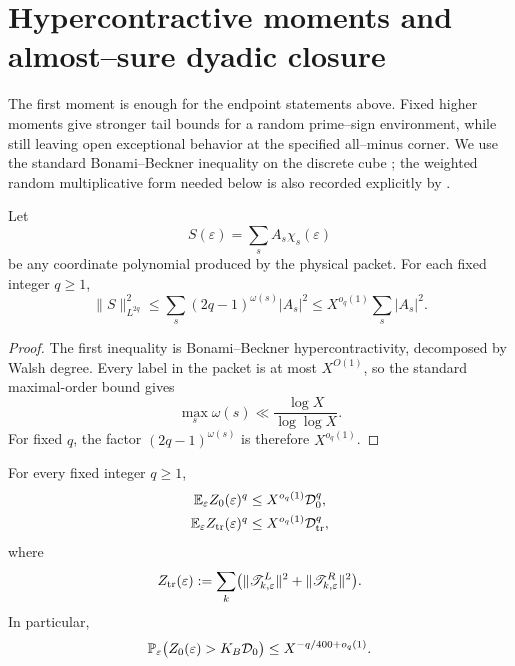 \section{Hypercontractive moments and almost--sure dyadic closure}
\label{sec:tpc43-moments}

The first moment is enough for the endpoint statements above.  Fixed
higher moments give stronger tail bounds for a random prime--sign
environment, while still leaving open exceptional behavior at the
specified all--minus corner.  We use the standard Bonami--Beckner inequality on the
discrete cube \citep{Bonami1970,Beckner1975}; the weighted random
multiplicative form needed below is also recorded explicitly by
\citet[Probability Result~2.3]{Harper2019HighMoments}.

\begin{lemma}
\label{lem:tpc43-one-coordinate-moment}
Let
\begin{equation}
 S(\varepsilon)=\sum_s A_s\chi_s(\varepsilon)
 \label{eq:tpc43-one-coordinate-polynomial}
\end{equation}
be any coordinate polynomial produced by the physical packet.  For each
fixed integer \(q\ge1\),
\begin{equation}
 \|S\|_{L^{2q}}^2
 \le
 \sum_s(2q-1)^{\omega(s)}|A_s|^2
 \le X^{o_q(1)}\sum_s|A_s|^2.
 \label{eq:tpc43-hypercontractive-coordinate}
\end{equation}
\end{lemma}

\begin{proof}
The first inequality is Bonami--Beckner hypercontractivity, decomposed by
Walsh degree.  Every label in the packet is at most \(X^{O(1)}\), so the
standard maximal-order bound gives
\begin{equation}
 \max_s\omega(s)\ll\frac{\log X}{\log\log X}.
 \label{eq:tpc43-max-omega}
\end{equation}
For fixed \(q\), the factor
\((2q-1)^{\omega(s)}\) is therefore \(X^{o_q(1)}\).
\end{proof}

\begin{theorem}
\label{thm:tpc43-fixed-moments}
For every fixed integer \(q\ge1\),
\begin{align}
 \mathbb E_\varepsilon Z_0(\varepsilon)^q
 &\le X^{o_q(1)}\mathcal D_0^q,
 \label{eq:tpc43-zero-q-moment}\\
 \mathbb E_\varepsilon Z_{\rm tr}(\varepsilon)^q
 &\le X^{o_q(1)}\mathcal D_{\rm tr}^q,
 \label{eq:tpc43-trace-q-moment}
\end{align}
where
\begin{equation}
 Z_{\rm tr}(\varepsilon)
 :=\sum_k
 \bigl(
  \|\mathscr T_{k,\varepsilon}^L\|^2
  +\|\mathscr T_{k,\varepsilon}^R\|^2
 \bigr).
 \label{eq:tpc43-trace-random-energy}
\end{equation}
In particular,
\begin{equation}
 \mathbb P_\varepsilon\bigl(
 Z_0(\varepsilon)>K_B\mathcal D_0
 \bigr)
 \le X^{-q/400+o_q(1)}.
 \label{eq:tpc43-zero-high-moment-tail}
\end{equation}
\end{theorem}

